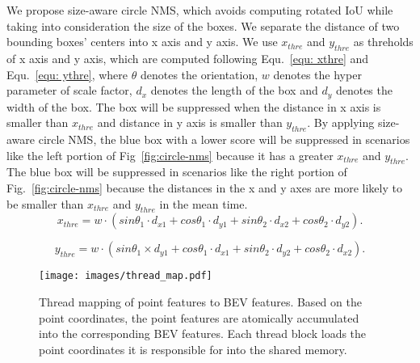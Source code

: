 \documentclass[letterpaper]{article} \usepackage[]{aaai23}  \usepackage{times}  \usepackage{helvet}  \usepackage{courier}  \usepackage[hyphens]{url}  \usepackage{graphicx} \urlstyle{rm} \def\UrlFont{\rm}  \usepackage{natbib}  \usepackage{caption} \frenchspacing  \setlength{\pdfpagewidth}{8.5in} \setlength{\pdfpageheight}{11in} \usepackage{algorithm}
\begin{document}
We propose size-aware circle NMS, which avoids computing rotated IoU while taking into consideration the size of the boxes. We separate the distance of two bounding boxes' centers into x axis and y axis. We use $x_{thre}$ and $y_{thre}$ as threholds of x axis and y axis, which are computed following Equ.~\ref{equ: xthre} and Equ.~\ref{equ: ythre}, where $\theta$ denotes the orientation, $w$ denotes the hyper parameter of scale factor, $d_x$ denotes the length of the box and $d_y$ denotes the width of the box. The box will be suppressed when the distance in x axis is smaller than $x_{thre}$ and distance in y axis is smaller than $y_{thre}$. By applying size-aware circle NMS, the blue box with a lower score will be suppressed in scenarios like the left portion of Fig~\ref{fig:circle-nms} because it has a greater $x_{thre}$ and $y_{thre}$. The blue box will be suppressed in scenarios like the right portion of Fig.~\ref{fig:circle-nms} because the distances in the x and y axes are more likely to be smaller than $x_{thre}$ and $y_{thre}$ in the mean time.
\begin{equation}
\label{equ: xthre}
    x_{thre} = w \cdot (sin\theta_1 \cdot d_{x1} + cos\theta_1 \cdot d_{y1} + sin\theta_2 \cdot d_{x2} + cos\theta_2 \cdot d_{y2}).
\end{equation}

\begin{equation}
\label{equ: ythre}
    y_{thre} = w \cdot (sin\theta_1 \times d_{y1} + cos\theta_1 \cdot d_{x1} + sin\theta_2 \cdot d_{y2} + cos\theta_2 \cdot d_{x2}).
\end{equation}


\begin{figure}[b]
\texttt{[image: images/thread\_map.pdf]}
\centering
\caption{Thread mapping of point features to BEV features. Based on the point coordinates, the point features are atomically accumulated into the corresponding BEV features. Each thread block loads the point coordinates it is responsible for into the shared memory.}
\label{fig:mapping}
\end{figure}

\begin{table*}
\centering
{}
\caption{Detection results on the nuScenes \emph{val} set. WN denotes Weight Net.}
\label{tab:performance-analysis-1}
\end{table*}
\end{document}
